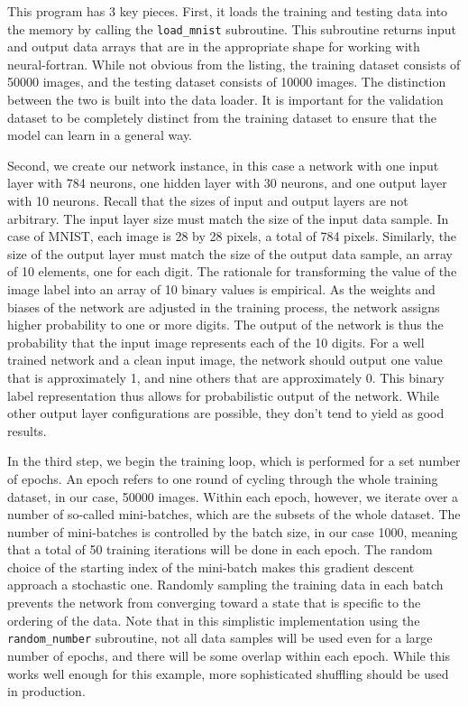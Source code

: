 \documentclass[sigplan, review=false, screen=true, balance=true]{acmart}
\begin{document}
This program has 3 key pieces. First, it loads the training and testing data
into the memory by calling the \lstinline{load_mnist} subroutine. This subroutine
returns input and output data arrays that are in the appropriate shape for
working with neural-fortran. While not obvious from the listing, the training
dataset consists of 50000 images, and the testing dataset consists of 10000
images. The distinction between the two is built into the data loader.
It is important for the validation dataset to be completely distinct 
from the training dataset to ensure that the model can learn in a general way. 

Second, we create our network instance, in this case a network with one input
layer with 784 neurons, one hidden layer with 30 neurons, and one output layer
with 10 neurons. Recall that the sizes of input and output layers are not
arbitrary. The input layer size must match the size of the input data sample.
In case of MNIST, each image is 28 by 28 pixels, a total of 784 pixels.
Similarly, the size of the output layer must match the size of the output
data sample, an array of 10 elements, one for each digit.
The rationale for transforming the value of the image label into an array
of 10 binary values is empirical. 
As the weights and biases of the network are adjusted in the training 
process, the network assigns higher probability to one or more digits.
The output of the network is thus the probability that the input image represents
each of the 10 digits. For a well trained network and a clean input image, 
the network should output one value that is approximately 1, and nine others
that are approximately 0. This binary label representation thus allows for 
probabilistic output of the network. While other output layer configurations 
are possible, they don't tend to yield as good results.

In the third step, we begin the training loop, which is performed for a set
number of epochs. An epoch refers to one round of cycling through the whole
training dataset, in our case, 50000 images. Within each epoch, however,
we iterate over a number of so-called mini-batches, which are the subsets of
the whole dataset. The number of mini-batches is controlled by the batch size,
in our case 1000, meaning that a total of 50 training iterations will be done
in each epoch. The random choice of the starting index of the mini-batch
makes this gradient descent approach a stochastic one. 
Randomly sampling the training data in each batch prevents the network
from converging toward a state that is specific to the ordering of the data.
Note that in this simplistic implementation using the \lstinline{random_number} subroutine, 
not all data samples will be used even for a large number of epochs,
and there will be some overlap within each epoch. 
While this works well enough for this example, 
more sophisticated shuffling should be used in production.
\end{document}
